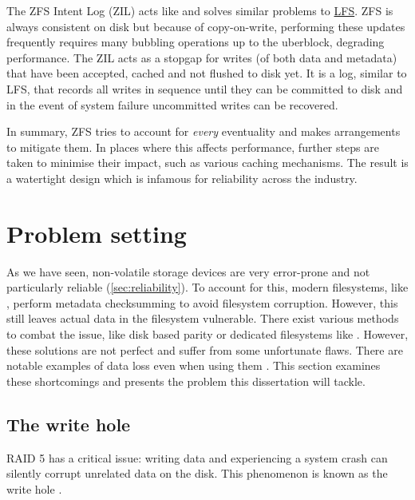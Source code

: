             The ZFS Intent Log (ZIL) acts like and solves similar problems to
            \hyperref[sec:LFS]{LFS}. ZFS is always consistent on disk but because
            of copy-on-write, performing these updates frequently requires many
            bubbling operations up to the uberblock, degrading performance. The
            ZIL acts as a stopgap for writes (of both data and metadata) that
            have been accepted, cached and not flushed to disk yet. It is a
            log, similar to LFS, that records all writes in sequence until they
            can be committed to disk and in the event of system failure uncommitted
            writes can be recovered.

            In summary, ZFS tries to account for \textit{every} eventuality and
            makes arrangements to mitigate them. In places where this affects
            performance, further steps are taken to minimise their impact, such
            as various caching mechanisms. The result is a watertight design
            which is infamous for reliability across the industry.

\chapter{Problem setting}

    As we have seen, non-volatile storage devices are very error-prone and not
    particularly reliable (\autoref{sec:reliability}). To account for this, modern
    filesystems, like , perform metadata checksumming to
    avoid filesystem corruption. However, this still leaves actual data in the
    filesystem vulnerable. There exist various methods to combat the issue,
    like disk based parity  or dedicated filesystems like
    . However, these solutions are not perfect and suffer
    from some unfortunate flaws. There are notable examples of data loss even
    when using them \cite{LTT_data_loss}. This section examines these
    shortcomings and presents the problem this dissertation will tackle.

    \section{The write hole}
        \label{sec:RAID_problems}

        RAID 5 has a critical issue: writing data and experiencing a system
        crash can silently corrupt unrelated data on the disk. This phenomenon
        is known as the write hole \cite{LWN_md_journal}.

